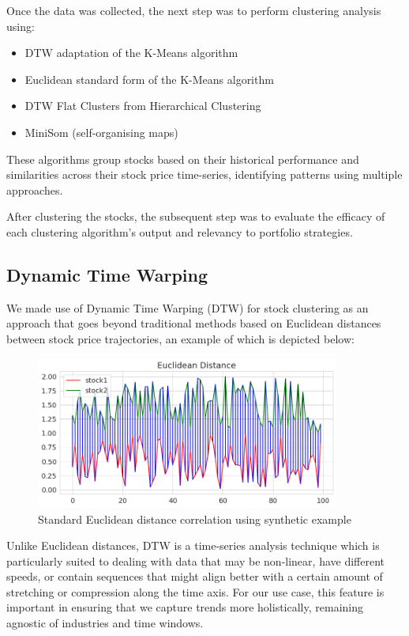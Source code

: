 \documentclass[11pt]{article}
\begin{document}
Once the data was collected, the next step was to perform  clustering analysis using: 

\begin{itemize}
    \item DTW adaptation of the K-Means algorithm
    \item Euclidean standard form of the K-Means algorithm
    \item DTW Flat Clusters from Hierarchical Clustering \item MiniSom (self-organising maps)
\end{itemize}

These algorithms group stocks based on their historical performance and similarities across their stock price time-series, identifying patterns using multiple approaches. 

After clustering the stocks, the subsequent step was to evaluate the efficacy of each clustering algorithm's output and relevancy to portfolio strategies.

\subsection{Dynamic Time Warping}
\label{sec:dtw}

We made use of Dynamic Time Warping (DTW) for stock clustering as an approach that goes beyond traditional methods based on Euclidean distances between stock price trajectories, an example of which is depicted below: 

\begin{figure}[H]
\centering
\includegraphics[width=10cm]{img/eculidian-sample.png} 
\caption{Standard Euclidean distance correlation using synthetic example}
\label{fig:euclidean_synth}
\end{figure}

Unlike Euclidean distances, DTW is a time-series analysis technique which is particularly suited to dealing with data that may be non-linear, have different speeds, or contain sequences that might align better with a certain amount of stretching or compression along the time axis. For our use case, this feature is important in ensuring that we capture trends more holistically, remaining agnostic of industries and time windows.
\end{document}
